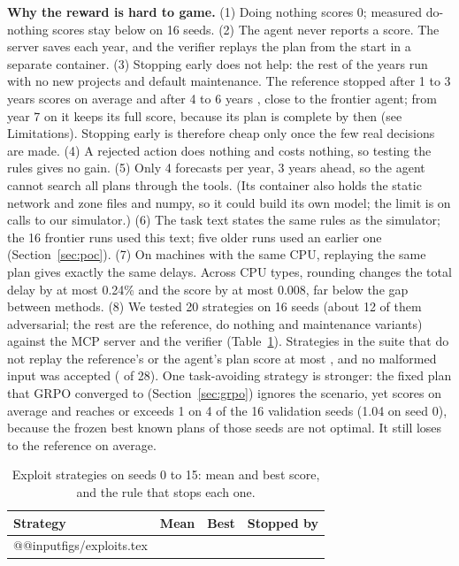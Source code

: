\documentclass{article}
\begin{document}
\textbf{Why the reward is hard to game.} (1) Doing nothing scores 0; measured do-nothing scores stay below \nothingAbsMax{} on 16 seeds. (2) The agent never reports a score. The server saves each year, and the verifier replays the plan from the start in a separate container. (3) Stopping early does not help: the rest of the years run with no new projects and default maintenance. The reference stopped after 1 to 3 years scores \ExploitStopThree{} on average and after 4 to 6 years \ExploitStopFive{}, close to the frontier agent; from year 7 on it keeps its full score, because its plan is complete by then (see Limitations). Stopping early is therefore cheap only once the few real decisions are made. (4) A rejected action does nothing and costs nothing, so testing the rules gives no gain. (5) Only 4 forecasts per year, 3 years ahead, so the agent cannot search all plans through the tools. (Its container also holds the static network and zone files and numpy, so it could build its own model; the limit is on calls to our simulator.) (6) The task text states the same rules as the simulator; the 16 frontier runs used this text; five older runs used an earlier one (Section~\ref{sec:poc}). (7) On machines with the same CPU, replaying the same plan gives exactly the same delays. Across CPU types, rounding changes the total delay by at most 0.24\% and the score by at most 0.008, far below the gap between methods. (8) We tested 20 strategies on 16 seeds (about 12 of them adversarial; the rest are the reference, do nothing and maintenance variants) against the MCP server and the verifier (Table~\ref{tab:exploits}). Strategies in the suite that do not replay the reference's or the agent's plan score at most \ExploitBestNonRef{}, and no malformed input was accepted (\ExploitAcceptedBad{} of 28). One task-avoiding strategy is stronger: the fixed plan that GRPO converged to (Section~\ref{sec:grpo}) ignores the scenario, yet scores \grpoConstVal{} on average and reaches or exceeds 1 on 4 of the 16 validation seeds (1.04 on seed 0), because the frozen best known plans of those seeds are not optimal. It still loses to the reference on average.

\begin{table}[t]
\caption{Exploit strategies on seeds 0 to 15: mean and best score, and the rule that stops each one.}
\label{tab:exploits}
\centering\footnotesize
\begin{tabular}{@{}lrrl@{}}
\toprule
Strategy & Mean & Best & Stopped by \\
\midrule
\csname @@input\endcsname figs/exploits.tex
\bottomrule
\end{tabular}
\end{table}
\end{document}
